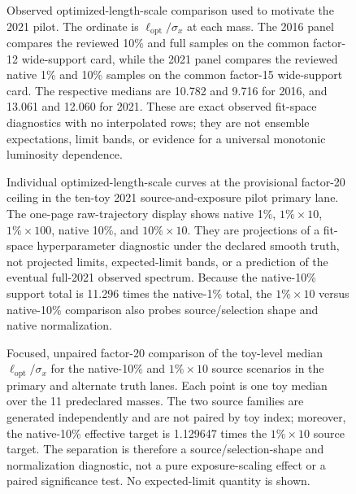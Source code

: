 \begin{figure}[H]
\centering
{}
\caption{Observed optimized-length-scale comparison used to motivate the 2021 pilot.
The ordinate is $\ell_{\mathrm{opt}}/\sigma_x$ at each mass. The 2016 panel compares
the reviewed 10\% and full samples on the common factor-12 wide-support card, while the
2021 panel compares the reviewed native 1\% and 10\% samples on the common factor-15
wide-support card. The respective medians are 10.782 and 9.716 for 2016, and
13.061 and 12.060 for 2021. These are exact observed fit-space diagnostics with no
interpolated rows; they are not ensemble expectations, limit bands, or evidence for
a universal monotonic luminosity dependence.}
\label{fig:v4p1-ls-observed-dataset-comparison}
\end{figure}

\begin{figure}[H]
\centering
{}
\caption{Individual optimized-length-scale curves at the provisional factor-20
ceiling in the ten-toy 2021 source-and-exposure pilot primary lane. The one-page
raw-trajectory display shows native 1\%,
$1\%\times10$, $1\%\times100$, native 10\%, and $10\%\times10$. They are
projections of a fit-space hyperparameter diagnostic under the declared smooth truth,
not projected limits, expected-limit bands, or a prediction of the eventual full-2021
observed spectrum. Because the native-10\% support total is 11.296 times the
native-1\% total, the $1\%\times10$ versus native-10\% comparison also probes
source/selection shape and native normalization.}
\label{fig:v4p1-ls-toy-ensemble-curves}
\end{figure}

\begin{figure}[H]
\centering
{}
\caption{Focused, unpaired factor-20 comparison of the toy-level median
$\ell_{\mathrm{opt}}/\sigma_x$ for the native-10\% and
$1\%\times10$ source scenarios in the primary and alternate truth lanes. Each point
is one toy median over the 11 predeclared masses. The two source families are generated
independently and are not paired by toy index; moreover, the native-10\% effective
target is 1.129647 times the $1\%\times10$ source target. The separation is therefore
a source/selection-shape and normalization diagnostic, not a pure exposure-scaling
effect or a paired significance test. No expected-limit quantity is shown.}
\label{fig:v4p1-ls-factor20-native10-vs-1pct-x10}
\end{figure}

